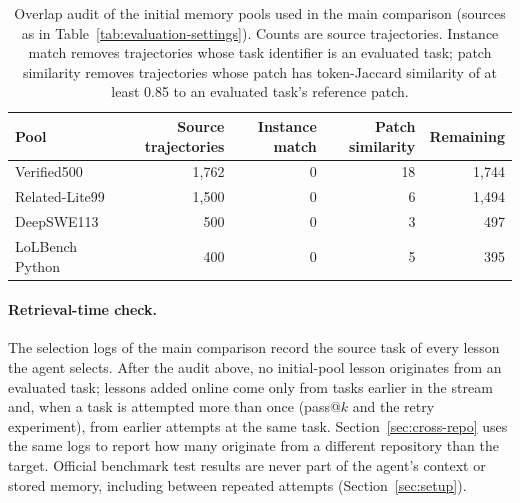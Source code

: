 \begin{table}[htbp]
\centering
\caption{Overlap audit of the initial memory pools used in the main comparison
(sources as in Table~\ref{tab:evaluation-settings}). Counts are source trajectories. Instance match removes trajectories whose task
identifier is an evaluated task; patch similarity removes trajectories whose
patch has token-Jaccard similarity of at least 0.85 to an evaluated task's
reference patch.}
\label{tab:overlap-audit}
\small
\begin{tabular}{lrrrr}
\toprule
Pool & Source trajectories & Instance match & Patch similarity & Remaining \\
\midrule
Verified500 & 1,762 & 0 & 18 & 1,744 \\
Related-Lite99 & 1,500 & 0 & 6 & 1,494 \\
DeepSWE113 & 500 & 0 & 3 & 497 \\
LoLBench Python & 400 & 0 & 5 & 395 \\
\bottomrule
\end{tabular}
\end{table}

\paragraph{Retrieval-time check.}
The selection logs of the main comparison record the source task of every
lesson the agent selects. After the audit above, no initial-pool lesson
originates from an evaluated task; lessons added online come only from tasks
earlier in the stream and, when a task is attempted more than once (pass@$k$
and the retry experiment), from earlier attempts at the same task. Section~\ref{sec:cross-repo} uses the
same logs to report how many originate from a different repository than the
target. Official benchmark test results are never part of the agent's context
or stored memory, including between repeated attempts
(Section~\ref{sec:setup}).
